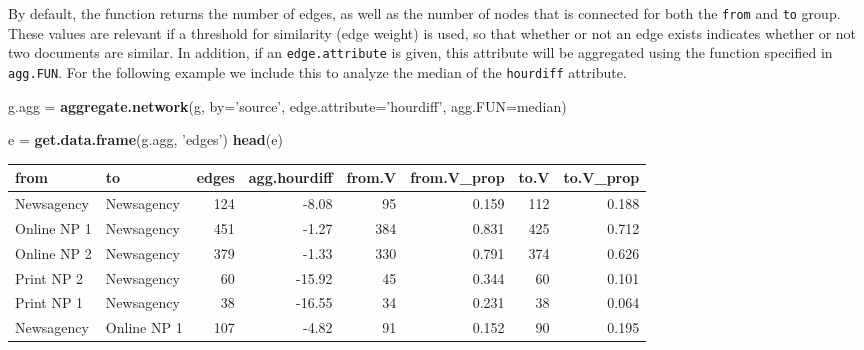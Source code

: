 \documentclass[]{article}
\newenvironment{Shaded}{\begin{snugshade}}{\end{snugshade}}
\newcommand{\KeywordTok}[1]{\textcolor[rgb]{0.13,0.29,0.53}{\textbf{{#1}}}}
\newcommand{\DataTypeTok}[1]{\textcolor[rgb]{0.13,0.29,0.53}{{#1}}}
\newcommand{\StringTok}[1]{\textcolor[rgb]{0.31,0.60,0.02}{{#1}}}
\newcommand{\NormalTok}[1]{{#1}}
\begin{document}
By default, the function returns the number of edges, as well as the
number of nodes that is connected for both the \texttt{from} and
\texttt{to} group. These values are relevant if a threshold for
similarity (edge weight) is used, so that whether or not an edge exists
indicates whether or not two documents are similar. In addition, if an
\texttt{edge.attribute} is given, this attribute will be aggregated
using the function specified in \texttt{agg.FUN}. For the following
example we include this to analyze the median of the \texttt{hourdiff}
attribute.

\begin{Shaded}
\begin{Highlighting}[]
\NormalTok{g.agg =}\StringTok{ }\KeywordTok{aggregate.network}\NormalTok{(g, }\DataTypeTok{by=}\StringTok{'source'}\NormalTok{, }\DataTypeTok{edge.attribute=}\StringTok{'hourdiff'}\NormalTok{, }\DataTypeTok{agg.FUN=}\NormalTok{median)}

\NormalTok{e =}\StringTok{ }\KeywordTok{get.data.frame}\NormalTok{(g.agg, }\StringTok{'edges'}\NormalTok{)}
\KeywordTok{head}\NormalTok{(e)}
\end{Highlighting}
\end{Shaded}

\begin{longtable}[c]{@{}llrrrrrr@{}}
\toprule
from & to & edges & agg.hourdiff & from.V & from.V\_prop & to.V &
to.V\_prop\tabularnewline
\midrule
\endhead
Newsagency & Newsagency & 124 & -8.08 & 95 & 0.159 & 112 &
0.188\tabularnewline
Online NP 1 & Newsagency & 451 & -1.27 & 384 & 0.831 & 425 &
0.712\tabularnewline
Online NP 2 & Newsagency & 379 & -1.33 & 330 & 0.791 & 374 &
0.626\tabularnewline
Print NP 2 & Newsagency & 60 & -15.92 & 45 & 0.344 & 60 &
0.101\tabularnewline
Print NP 1 & Newsagency & 38 & -16.55 & 34 & 0.231 & 38 &
0.064\tabularnewline
Newsagency & Online NP 1 & 107 & -4.82 & 91 & 0.152 & 90 &
0.195\tabularnewline
\bottomrule
\end{longtable}
\end{document}
